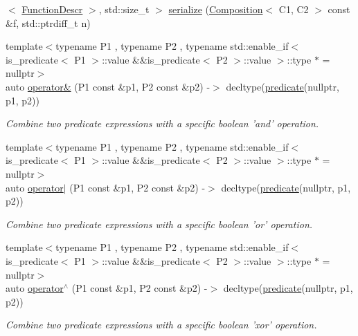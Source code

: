 \begin{DoxyCompactItemize}
$<$ \hyperlink{structpfq_1_1lang_1_1FunctionDescr}{Function\+Descr} $>$, std\+::size\+\_\+t $>$ \hyperlink{namespacepfq_1_1lang_a10060155d79b978287b3a4c1460ba494}{serialize} (\hyperlink{structpfq_1_1lang_1_1Composition}{Composition}$<$ C1, C2 $>$ const \&f, std\+::ptrdiff\+\_\+t n)
\item 
{\footnotesize template$<$typename P1 , typename P2 , typename std\+::enable\+\_\+if$<$ is\+\_\+predicate$<$ P1 $>$\+::value \&\&is\+\_\+predicate$<$ P2 $>$\+::value $>$\+::type $\ast$  = nullptr$>$ }\\auto \hyperlink{namespacepfq_1_1lang_af24d9c3092f064b0732a4b601dde2c64}{operator\&} (P1 const \&p1, P2 const \&p2) -\/$>$ decltype(\hyperlink{namespacepfq_1_1lang_aca9adafc436b7f851621b979fa1aaf88}{predicate}(nullptr, p1, p2))
\begin{DoxyCompactList}\small\item\em Combine two predicate expressions with a specific boolean 'and' operation. \end{DoxyCompactList}\item 
{\footnotesize template$<$typename P1 , typename P2 , typename std\+::enable\+\_\+if$<$ is\+\_\+predicate$<$ P1 $>$\+::value \&\&is\+\_\+predicate$<$ P2 $>$\+::value $>$\+::type $\ast$  = nullptr$>$ }\\auto \hyperlink{namespacepfq_1_1lang_a425bb535884185450da7addcdb47f35b}{operator$\vert$} (P1 const \&p1, P2 const \&p2) -\/$>$ decltype(\hyperlink{namespacepfq_1_1lang_aca9adafc436b7f851621b979fa1aaf88}{predicate}(nullptr, p1, p2))
\begin{DoxyCompactList}\small\item\em Combine two predicate expressions with a specific boolean 'or' operation. \end{DoxyCompactList}\item 
{\footnotesize template$<$typename P1 , typename P2 , typename std\+::enable\+\_\+if$<$ is\+\_\+predicate$<$ P1 $>$\+::value \&\&is\+\_\+predicate$<$ P2 $>$\+::value $>$\+::type $\ast$  = nullptr$>$ }\\auto \hyperlink{namespacepfq_1_1lang_aa6692a978788617acebfee6ded6ebbbc}{operator$^\wedge$} (P1 const \&p1, P2 const \&p2) -\/$>$ decltype(\hyperlink{namespacepfq_1_1lang_aca9adafc436b7f851621b979fa1aaf88}{predicate}(nullptr, p1, p2))
\begin{DoxyCompactList}\small\item\em Combine two predicate expressions with a specific boolean 'xor' operation. \end{DoxyCompactList}\item 

\end{DoxyCompactItemize}
